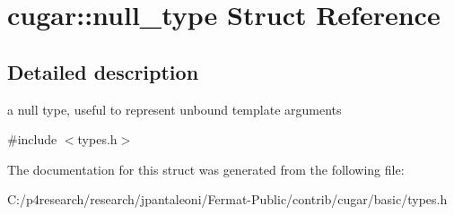 \hypertarget{structcugar_1_1null__type}{}\section{cugar\+:\+:null\+\_\+type Struct Reference}
\label{structcugar_1_1null__type}


\subsection{Detailed description}
a null type, useful to represent unbound template arguments 

{\ttfamily \#include $<$types.\+h$>$}



The documentation for this struct was generated from the following file\+:\begin{DoxyCompactItemize}
\item 
C\+:/p4research/research/jpantaleoni/\+Fermat-\/\+Public/contrib/cugar/basic/types.\+h\end{DoxyCompactItemize}

